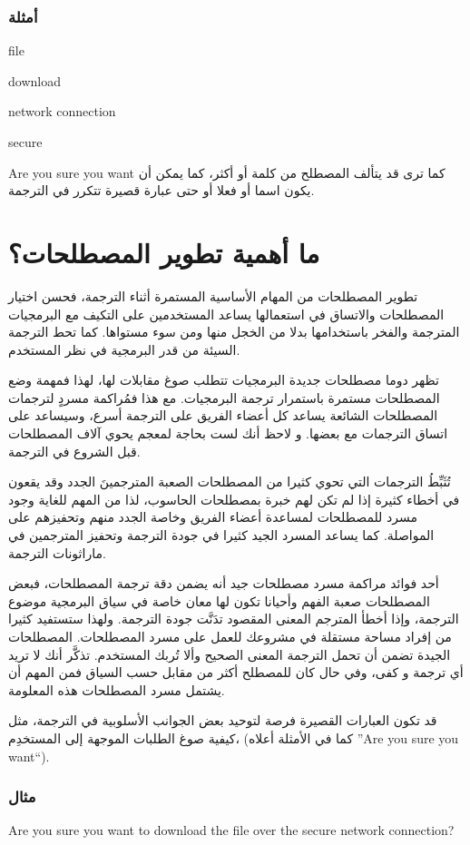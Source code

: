 \subsubsection{أمثلة}
\startitemize[1]
\item file
\item download
\item network connection
\item secure
\item Are you sure you want
\stopitemize
كما ترى قد يتألف المصطلح من كلمة أو أكثر، كما يمكن أن يكون اسما أو فعلا
أو حتى عبارة قصيرة تتكرر في الترجمة.

\section{ما أهمية تطوير المصطلحات؟}
تطوير المصطلحات من المهام الأساسية المستمرة أثناء الترجمة، فحسن اختيار
المصطلحات والاتساق في استعمالها يساعد المستخدمين على التكيف مع
البرمجيات المترجمة والفخر باستخدامها بدلا من الخجل منها ومن سوء
مستواها. كما تحط الترجمة السيئة من قدر البرمجية في نظر المستخدم.

تظهر دوما مصطلحات جديدة البرمجيات تتطلب صوغ مقابلات لها، لهذا فمهمة وضع
المصطلحات مستمرة باستمرار ترجمة البرمجيات. مع هذا فمُراكمة مسردٍ
لترجمات المصطلحات الشائعة يساعد كل أعضاء الفريق على الترجمة أسرع،
وسيساعد على اتساق الترجمات مع بعضها. و لاحظ أنك لست بحاجة لمعجم يحوي
آلاف المصطلحات قبل الشروع في الترجمة.

تُثَبِّطُ الترجمات التي تحوي كثيرا من المصطلحات الصعبة المترجمينَ الجدد
وقد يقعون في أخطاء كثيرة إذا لم تكن لهم خبرة بمصطلحات الحاسوب، لذا من
المهم للغاية وجود مسرد للمصطلحات لمساعدة أعضاء الفريق وخاصة الجدد منهم
وتحفيزهم على المواصلة. كما يساعد المسرد الجيد كثيرا في جودة الترجمة
وتحفيز المترجمين في ماراثونات الترجمة.

أحد فوائد مراكمة مسرد مصطلحات جيد أنه يضمن دقة ترجمة المصطلحات، فبعض
المصطلحات صعبة الفهم وأحيانا تكون لها معان خاصة في سياق البرمجية موضوع
الترجمة، وإذا أخطأ المترجم المعنى المقصود تدَنَّت جودة الترجمة. ولهذا
ستستفيد كثيرا من إفراد مساحة مستقلة في مشروعك للعمل على مسرد المصطلحات.
المصطلحات الجيدة تضمن أن تحمل الترجمة المعنى الصحيح وألا تُربك
المستخدم. تذكَّر أنك لا تريد أي ترجمة و كفى، وفي حال كان للمصطلح أكثر
من مقابل حسب السياق فمن المهم أن يشتمل مسرد المصطلحات هذه المعلومة.

قد تكون العبارات القصيرة فرصة لتوحيد بعض الجوانب الأسلوبية في الترجمة،
مثل كيفية صوغ الطلبات الموجهة إلى المستخدِم، (كما في الأمثلة أعلاه ”Are
you sure you want“).

\subsubsection{مثال}
Are you sure you want to download the file over the secure network
connection?

